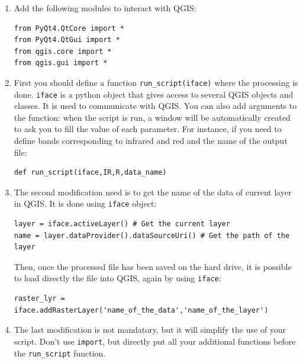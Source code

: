 \documentclass[a4paper,11pt,DIV=18]{scrartcl}
\begin{document}
\begin{enumerate}
\item Add the following modules to interact with QGIS:

\begin{verbatim}
from PyQt4.QtCore import *
from PyQt4.QtGui import *
from qgis.core import *
from qgis.gui import *
\end{verbatim}

\item First you  should define  a function  \texttt{run\_script(iface)} where  the
processing is done.  \texttt{iface} is a  python object that gives access to
several QGIS objects  and classes.  It is used  to communicate with
QGIS. You can  also add arguments to the function:  when the script
is run, a  window will be automatically created to  ask you to fill
the value  of each parameter. For  instance, if you need  to define
bands corresponding to infrared and red  and the name of the output
file:

\begin{verbatim}
def run_script(iface,IR,R,data_name)
\end{verbatim}

\item The  second modification  need is to  get the name  of the  data of
current layer in QGIS. It is done using \texttt{iface} object:

\begin{verbatim}
layer = iface.activeLayer() # Get the current layer
name = layer.dataProvider().dataSourceUri() # Get the path of the layer
\end{verbatim}

Then, once the processed file has  been saved on the hard drive, it
is possible  to load directly  the file  into QGIS, again  by using
\texttt{iface}:

\begin{verbatim}
raster_lyr = iface.addRasterLayer('name_of_the_data','name_of_the_layer')
\end{verbatim}

\item The  last modification is not  mandatory, but it will  simplify the
use of  your script. Don't  use \texttt{import},  but directly put  all your
additional functions before the \texttt{run\_script} function.
\end{enumerate}
\end{document}
